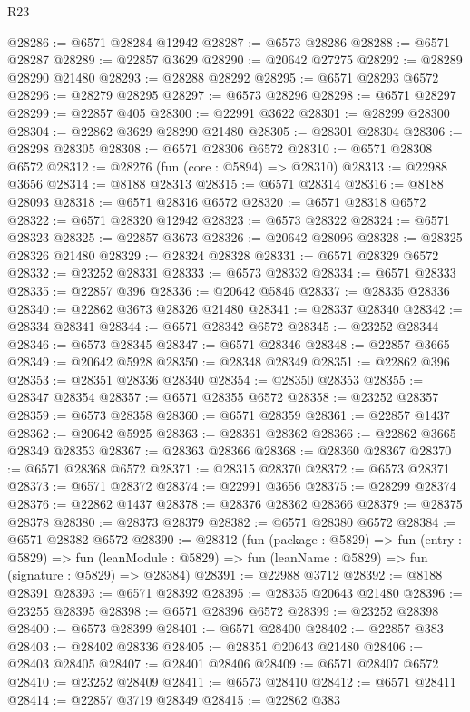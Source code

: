\begin{lexlean}{R23}
\begin{coremodule}
@28286 := @6571 @28284 @12942
@28287 := @6573 @28286
@28288 := @6571 @28287
@28289 := @22857 @3629
@28290 := @20642 @27275
@28292 := @28289 @28290 @21480
@28293 := @28288 @28292
@28295 := @6571 @28293 @6572
@28296 := @28279 @28295
@28297 := @6573 @28296
@28298 := @6571 @28297
@28299 := @22857 @405
@28300 := @22991 @3622
@28301 := @28299 @28300
@28304 := @22862 @3629 @28290 @21480
@28305 := @28301 @28304
@28306 := @28298 @28305
@28308 := @6571 @28306 @6572
@28310 := @6571 @28308 @6572
@28312 := @28276 (fun (core : @5894) => @28310)
@28313 := @22988 @3656
@28314 := @8188 @28313
@28315 := @6571 @28314
@28316 := @8188 @28093
@28318 := @6571 @28316 @6572
@28320 := @6571 @28318 @6572
@28322 := @6571 @28320 @12942
@28323 := @6573 @28322
@28324 := @6571 @28323
@28325 := @22857 @3673
@28326 := @20642 @28096
@28328 := @28325 @28326 @21480
@28329 := @28324 @28328
@28331 := @6571 @28329 @6572
@28332 := @23252 @28331
@28333 := @6573 @28332
@28334 := @6571 @28333
@28335 := @22857 @396
@28336 := @20642 @5846
@28337 := @28335 @28336
@28340 := @22862 @3673 @28326 @21480
@28341 := @28337 @28340
@28342 := @28334 @28341
@28344 := @6571 @28342 @6572
@28345 := @23252 @28344
@28346 := @6573 @28345
@28347 := @6571 @28346
@28348 := @22857 @3665
@28349 := @20642 @5928
@28350 := @28348 @28349
@28351 := @22862 @396
@28353 := @28351 @28336 @28340
@28354 := @28350 @28353
@28355 := @28347 @28354
@28357 := @6571 @28355 @6572
@28358 := @23252 @28357
@28359 := @6573 @28358
@28360 := @6571 @28359
@28361 := @22857 @1437
@28362 := @20642 @5925
@28363 := @28361 @28362
@28366 := @22862 @3665 @28349 @28353
@28367 := @28363 @28366
@28368 := @28360 @28367
@28370 := @6571 @28368 @6572
@28371 := @28315 @28370
@28372 := @6573 @28371
@28373 := @6571 @28372
@28374 := @22991 @3656
@28375 := @28299 @28374
@28376 := @22862 @1437
@28378 := @28376 @28362 @28366
@28379 := @28375 @28378
@28380 := @28373 @28379
@28382 := @6571 @28380 @6572
@28384 := @6571 @28382 @6572
@28390 := @28312
    (fun (package : @5829) =>
    fun (entry : @5829) =>
    fun (leanModule : @5829) => fun (leanName : @5829) => fun (signature : @5829) => @28384)
@28391 := @22988 @3712
@28392 := @8188 @28391
@28393 := @6571 @28392
@28395 := @28335 @20643 @21480
@28396 := @23255 @28395
@28398 := @6571 @28396 @6572
@28399 := @23252 @28398
@28400 := @6573 @28399
@28401 := @6571 @28400
@28402 := @22857 @383
@28403 := @28402 @28336
@28405 := @28351 @20643 @21480
@28406 := @28403 @28405
@28407 := @28401 @28406
@28409 := @6571 @28407 @6572
@28410 := @23252 @28409
@28411 := @6573 @28410
@28412 := @6571 @28411
@28414 := @22857 @3719 @28349
@28415 := @22862 @383

\end{coremodule}
\end{lexlean}
